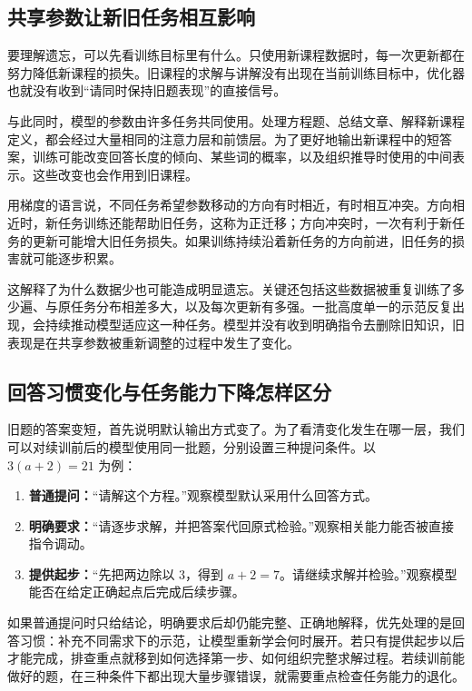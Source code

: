 \subsection{共享参数让新旧任务相互影响}

要理解遗忘，可以先看训练目标里有什么。只使用新课程数据时，每一次更新都在努力降低新课程的损失。旧课程的求解与讲解没有出现在当前训练目标中，优化器也就没有收到“请同时保持旧题表现”的直接信号。

与此同时，模型的参数由许多任务共同使用。处理方程题、总结文章、解释新课程定义，都会经过大量相同的注意力层和前馈层。为了更好地输出新课程中的短答案，训练可能改变回答长度的倾向、某些词的概率，以及组织推导时使用的中间表示。这些改变也会作用到旧课程。

用梯度的语言说，不同任务希望参数移动的方向有时相近，有时相互冲突。方向相近时，新任务训练还能帮助旧任务，这称为正迁移；方向冲突时，一次有利于新任务的更新可能增大旧任务损失。如果训练持续沿着新任务的方向前进，旧任务的损害就可能逐步积累。

这解释了为什么数据少也可能造成明显遗忘。关键还包括这些数据被重复训练了多少遍、与原任务分布相差多大，以及每次更新有多强。一批高度单一的示范反复出现，会持续推动模型适应这一种任务。模型并没有收到明确指令去删除旧知识，旧表现是在共享参数被重新调整的过程中发生了变化。

\subsection{回答习惯变化与任务能力下降怎样区分}

旧题的答案变短，首先说明默认输出方式变了。为了看清变化发生在哪一层，我们可以对续训前后的模型使用同一批题，分别设置三种提问条件。以 $3(a+2)=21$ 为例：

\begin{enumerate}
    \item \textbf{普通提问：}“请解这个方程。”观察模型默认采用什么回答方式。
    \item \textbf{明确要求：}“请逐步求解，并把答案代回原式检验。”观察相关能力能否被直接指令调动。
    \item \textbf{提供起步：}“先把两边除以 3，得到 $a+2=7$。请继续求解并检验。”观察模型能否在给定正确起点后完成后续步骤。
\end{enumerate}

如果普通提问时只给结论，明确要求后却仍能完整、正确地解释，优先处理的是回答习惯：补充不同需求下的示范，让模型重新学会何时展开。若只有提供起步以后才能完成，排查重点就移到如何选择第一步、如何组织完整求解过程。若续训前能做好的题，在三种条件下都出现大量步骤错误，就需要重点检查任务能力的退化。

